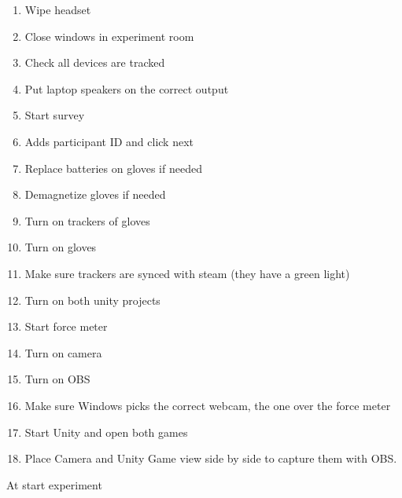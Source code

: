 \begin{enumerate}
\itemsep0em 
\item Wipe headset
\item Close windows in experiment room
\item Check all devices are tracked
\item Put laptop speakers on the correct output
\item Start survey
\item Adds participant ID and click next
\item Replace batteries on gloves if needed
\item Demagnetize gloves if needed
\item Turn on trackers of gloves
\item Turn on gloves
\item Make sure trackers are synced with steam (they have a green light)
\item Turn on both unity projects
\item Start force meter
\item Turn on camera 
\item Turn on OBS 
\item Make sure Windows picks the correct webcam, the one over the force meter
\item Start Unity and open both games
\item Place Camera and Unity Game view side by side to capture them with OBS.
\end{enumerate}
At start experiment
